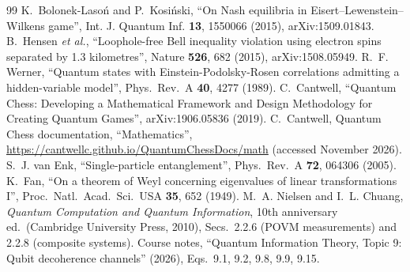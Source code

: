 \documentclass[11pt,a4paper]{article}
\begin{document}
\begin{thebibliography}{99}
 K.~Bolonek-Laso\'n and P.~Kosi\'nski, ``On Nash equilibria in Eisert--Lewenstein--Wilkens game'', Int. J. Quantum Inf. \textbf{13}, 1550066 (2015), arXiv:1509.01843.
 B.~Hensen \emph{et al.}, ``Loophole-free Bell inequality violation using electron spins separated by 1.3 kilometres'', Nature \textbf{526}, 682 (2015), arXiv:1508.05949.
 R.~F. Werner, ``Quantum states with Einstein-Podolsky-Rosen correlations admitting a hidden-variable model'', Phys.\ Rev.\ A \textbf{40}, 4277 (1989).
 C.~Cantwell, ``Quantum Chess: Developing a Mathematical Framework and Design Methodology for Creating Quantum Games'', arXiv:1906.05836 (2019).
 C.~Cantwell, Quantum Chess documentation, ``Mathematics'', \url{https://cantwellc.github.io/QuantumChessDocs/math} (accessed November 2026).
 S.~J. van Enk, ``Single-particle entanglement'', Phys.\ Rev.\ A \textbf{72}, 064306 (2005).
 K.~Fan, ``On a theorem of Weyl concerning eigenvalues of linear transformations I'', Proc.\ Natl.\ Acad.\ Sci.\ USA \textbf{35}, 652 (1949).
 M.~A. Nielsen and I.~L. Chuang, \emph{Quantum Computation and Quantum Information}, 10th anniversary ed.\ (Cambridge University Press, 2010), Secs.~2.2.6 (POVM measurements) and 2.2.8 (composite systems).
 Course notes, ``Quantum Information Theory, Topic 9: Qubit decoherence channels'' (2026), Eqs.\ 9.1, 9.2, 9.8, 9.9, 9.15.
\end{thebibliography}
\end{document}

